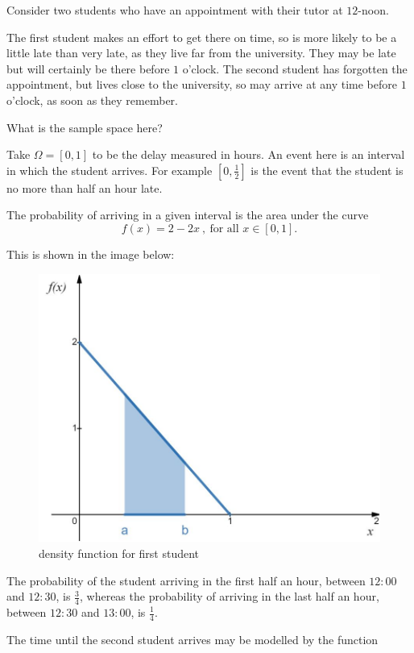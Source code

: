 \documentclass[
]{book}
\theoremstyle{definition}
\theoremstyle{definition}
\theoremstyle{definition}
\theoremstyle{definition}
\theoremstyle{remark}
\begin{document}
Consider two students who have an appointment with their tutor at \(12\)-noon.

The first student makes an effort to get there on time, so is more likely to be a little late than very late, as they live far from the university. They may be late but will certainly be there before \(1\) o'clock.
The second student has forgotten the appointment, but lives close to the university, so may arrive at any time before \(1\) o'clock, as soon as they remember.

What is the sample space here?

Take \(\Omega = [0,1]\) to be the delay measured in hours. An event here is an interval in which the student arrives. For example \([0,\frac{1}{2}]\) is the event that the student is no more than half an hour late.

The probability of arriving in a given interval is the area under the curve \[f(x) = 2-2x \ ,\ \text{for all } x\in[0,1].\]

This is shown in the image below:

\begin{figure}

{\centering \includegraphics[width=0.75\linewidth]{./figures/student1} 

}

\caption{density function for first student}\label{fig:student1}
\end{figure}

The probability of the student arriving in the first half an hour, between \(12:00\) and \(12:30\), is \(\frac{3}{4}\), whereas the probability of arriving in the last half an hour, between \(12:30\) and \(13:00\), is \(\frac{1}{4}\).

The time until the second student arrives may be modelled by the function
\end{document}
